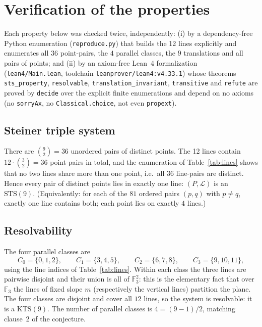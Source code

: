 \documentclass[11pt]{article}
\begin{document}
\section{Verification of the properties}

Each property below was checked twice, independently: (i) by a
dependency-free Python enumeration (\texttt{reproduce.py}) that builds the 12
lines explicitly and enumerates all $36$ point-pairs, the $4$ parallel
classes, the $9$ translations and all pairs of points; and (ii) by an
axiom-free Lean~4 formalization (\texttt{lean4/Main.lean}, toolchain
\texttt{leanprover/lean4:v4.33.1}) whose theorems \texttt{sts\_property},
\texttt{resolvable}, \texttt{translation\_invariant}, \texttt{transitive} and
\texttt{refute} are proved by \texttt{decide} over the explicit finite
enumerations and depend on no axioms (no \texttt{sorryAx}, no
\texttt{Classical.choice}, not even \texttt{propext}).

\subsection{Steiner triple system}

There are $\binom{9}{2} = 36$ unordered pairs of distinct points.  The 12
lines contain $12 \cdot \binom{3}{2} = 36$ point-pairs in total, and the
enumeration of Table~\ref{tab:lines} shows that no two lines share more than
one point, i.e.\ all $36$ line-pairs are distinct.  Hence every pair of
distinct points lies in exactly one line: $(P, \mathcal{L})$ is an
$\mathrm{STS}(9)$.  (Equivalently: for each of the $81$ ordered pairs
$(p,q)$ with $p \neq q$, exactly one line contains both; each point lies on
exactly $4$ lines.)

\subsection{Resolvability}

The four parallel classes are
\[
C_0 = \{0,1,2\}, \qquad
C_1 = \{3,4,5\}, \qquad
C_2 = \{6,7,8\}, \qquad
C_3 = \{9,10,11\},
\]
using the line indices of Table~\ref{tab:lines}.  Within each class the three
lines are pairwise disjoint and their union is all of
$\mathbb{F}_3^2$: this is the elementary fact that over $\mathbb{F}_3$ the
lines of fixed slope $m$ (respectively the vertical lines) partition the
plane.  The four classes are disjoint and cover all $12$ lines, so the system
is resolvable: it is a $\mathrm{KTS}(9)$.  The number of parallel classes is
$4 = (9-1)/2$, matching clause~2 of the conjecture.
\end{document}
